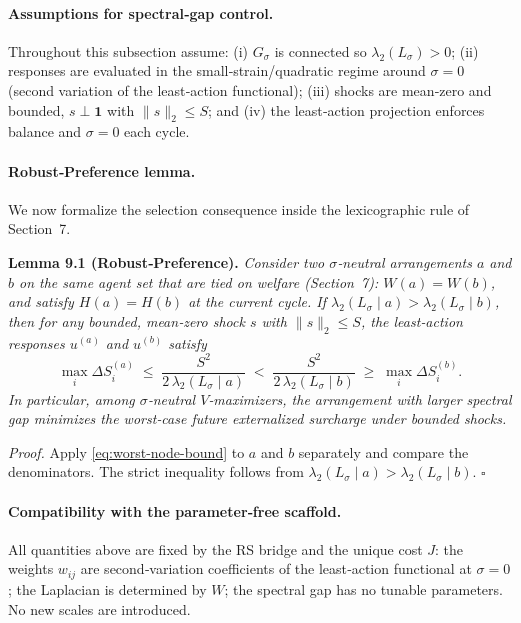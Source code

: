 \documentclass[11pt]{article}
\begin{document}
\paragraph{Assumptions for spectral‑gap control.}
Throughout this subsection assume: (i) $G_\sigma$ is connected so $\lambda_2(L_\sigma)>0$; (ii) responses are evaluated in the small‑strain/quadratic regime around $\sigma\!=\!0$ (second variation of the least‑action functional); (iii) shocks are mean‑zero and bounded, $s\perp \mathbf{1}$ with $\|s\|_2\le S$; and (iv) the least‑action projection enforces balance and $\sigma\!=\!0$ each cycle.

\paragraph{Robust‑Preference lemma.}
We now formalize the selection consequence inside the lexicographic rule of Section~7.

\medskip
\noindent\textbf{Lemma 9.1 (Robust‑Preference).}
\emph{Consider two $\sigma$‑neutral arrangements $a$ and $b$ on the same agent set that are tied on welfare (Section~7): $W(a)=W(b)$, and satisfy $H(a)=H(b)$ at the current cycle. If $\lambda_2(L_\sigma\!\mid a)>\lambda_2(L_\sigma\!\mid b)$, then for any bounded, mean‑zero shock $s$ with $\|s\|_2\le S$, the least‑action responses $u^{(a)}$ and $u^{(b)}$ satisfy}
\begin{equation}
\max_i \Delta S_i^{(a)} \;\le\; \frac{S^2}{2\,\lambda_2(L_\sigma\!\mid a)}
\;<\;
\frac{S^2}{2\,\lambda_2(L_\sigma\!\mid b)}
\;\ge\; \max_i \Delta S_i^{(b)}.
\label{eq:robust-ineq}
\end{equation}
\emph{In particular, among $\sigma$‑neutral $V$‑maximizers, the arrangement with larger spectral gap minimizes the worst‑case future externalized surcharge under bounded shocks.}

\medskip
\noindent\emph{Proof.}
Apply \eqref{eq:worst-node-bound} to $a$ and $b$ separately and compare the denominators. The strict inequality follows from $\lambda_2(L_\sigma\!\mid a)>\lambda_2(L_\sigma\!\mid b)$. \hfill$\square$

\paragraph{Compatibility with the parameter‑free scaffold.}
All quantities above are fixed by the RS bridge and the unique cost $J$: the weights $w_{ij}$ are second‑variation coefficients of the least‑action functional at $\sigma\!=\!0$; the Laplacian is determined by $W$; the spectral gap has no tunable parameters. No new scales are introduced.
\end{document}
